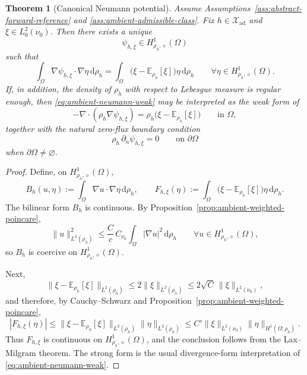 \documentclass{article}
\newtheorem{theorem}{Theorem}[section]
\theoremstyle{definition}
\renewcommand{\d}{\mathrm{d}}
\begin{document}
\begin{theorem}[Canonical Neumann potential]
    \label{thm:ambient-neumann}
    Assume Assumptions~\ref{ass:abstract-forward-reference} and
    \ref{ass:ambient-admissible-class}. Fix \(h\in \mathcal X_{\mathrm{ad}}\) and
    \(\xi\in L^2_0(\nu_0)\). Then there exists a unique
    \[
        \psi_{h,\xi}\in H^1_{\rho_h,\diamond}(\Omega)
    \]
    such that
    \begin{equation}
        \label{eq:ambient-neumann-weak}
        \int_\Omega \nabla\psi_{h,\xi}\cdot\nabla\eta\,\d\rho_h
        =
        \int_\Omega
        \bigl(\xi-\mathbb E_{\rho_h}[\xi]\bigr)\eta\,\d\rho_h
        \qquad
        \forall \eta\in H^1_{\rho_h,\diamond}(\Omega).
    \end{equation}
    If, in addition, the density of \(\rho_h\) with respect to Lebesgue measure is regular enough,
    then \eqref{eq:ambient-neumann-weak} may be interpreted as the weak form of
    \begin{equation}
        \label{eq:ambient-neumann-strong}
        -\nabla\cdot(\rho_h\nabla\psi_{h,\xi})
        =
        \rho_h\bigl(\xi-\mathbb E_{\rho_h}[\xi]\bigr)
        \qquad\text{in }\Omega,
    \end{equation}
    together with the natural zero-flux boundary condition
    \begin{equation}
        \label{eq:ambient-neumann-bc}
        \rho_h\,\partial_n\psi_{h,\xi}=0
        \qquad\text{on }\partial\Omega
    \end{equation}
    when \(\partial\Omega\neq\varnothing\).
\end{theorem}

\begin{proof}
    Define, on \(H^1_{\rho_h,\diamond}(\Omega)\),
    \[
        B_h(u,\eta):=\int_\Omega \nabla u\cdot \nabla\eta\,\d\rho_h,
        \qquad
        F_{h,\xi}(\eta)
        :=
        \int_\Omega
        \bigl(\xi-\mathbb E_{\rho_h}[\xi]\bigr)\eta\,\d\rho_h.
    \]
    The bilinear form \(B_h\) is continuous. By
    Proposition~\ref{prop:ambient-weighted-poincare},
    \[
        \|u\|_{L^2(\rho_h)}^2
        \le
        \frac{C}{c}\,C_{\nu_0}
        \int_\Omega |\nabla u|^2\,\d\rho_h
        \qquad
        \forall u\in H^1_{\rho_h,\diamond}(\Omega),
    \]
    so \(B_h\) is coercive on \(H^1_{\rho_h,\diamond}(\Omega)\).

    Next,
    \[
        \|\xi-\mathbb E_{\rho_h}[\xi]\|_{L^2(\rho_h)}
        \le
        2\|\xi\|_{L^2(\rho_h)}
        \le
        2\sqrt{C}\,\|\xi\|_{L^2(\nu_0)},
    \]
    and therefore, by Cauchy--Schwarz and Proposition~\ref{prop:ambient-weighted-poincare},
    \[
        |F_{h,\xi}(\eta)|
        \le
        \|\xi-\mathbb E_{\rho_h}[\xi]\|_{L^2(\rho_h)}
        \|\eta\|_{L^2(\rho_h)}
        \le
        C'\|\xi\|_{L^2(\nu_0)}\|\eta\|_{H^1(\Omega;\rho_h)}.
    \]
    Thus \(F_{h,\xi}\) is continuous on \(H^1_{\rho_h,\diamond}(\Omega)\), and the conclusion
    follows from the Lax--Milgram theorem. The strong form is the usual divergence-form
    interpretation of \eqref{eq:ambient-neumann-weak}.
\end{proof}
\end{document}
